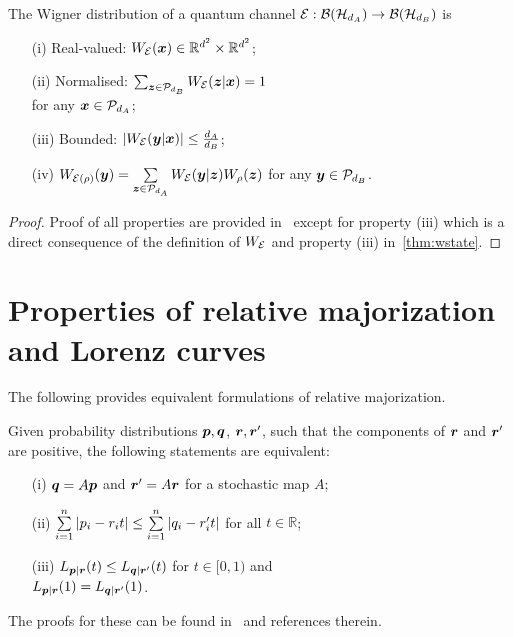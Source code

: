 \documentclass[pra,
aps,
twocolumn,
superscriptaddress,
groupedaddress,
nofootinbib,
reprint
]{revtex4-1}
\begin{document}
\begin{proposition}
    \label{thm:wchannel}
    The Wigner distribution of a quantum channel ${\mathcal E}: \mathcal{B}(\mathcal{H}_{d_A}) \rightarrow \mathcal{B}(\mathcal{H}_{d_B})$ is
    \begin{enumerate}
        \item[(i)]\label{en:wo1} Real-valued: $\W{\E}(\x) \in \mathbb{R}^{d^2} \times \mathbb{R}^{d^2}$;
        \item[(ii)]\label{en:wo2} Normalised: $\sum_{\bmz \in \cal{P}_{d_B}} \W[\bmz|\bmx]{\E} = 1$ \\ 
        for any $\bm{x} \in \mathcal{P}_{d_A}$;
        \item[(iii)]\label{en:wo3} Bounded: $\abs{\W[\bmy|\bmx]{\E}} \leq \frac{d_A}{d_B}$;
	    \item[(iv)]\label{en:wo4} $\W[\bmy]{\E(\rho)} = \sum\limits_{\bmz \in \cal{P}_{d_{A}}} \W[\bmy|\bmz]{\E} \W[\bmz]{\rho}$ for any $\bm{y} \in \mathcal{P}_{d_B}$.
    \end{enumerate}
\end{proposition}
\begin{proof}
	Proof of all properties are provided in~\cite{Wang_2019} except for property (iii) which is a direct consequence of the definition of $\W{\E}$ and property (iii) in~\cref{thm:wstate}.
\end{proof}


\section{Properties of relative majorization and Lorenz curves}
\label{app:major}
	
The following provides equivalent formulations of relative majorization. 

\begin{proposition}\label{prop:rmajor}
Given probability distributions $\boldsymbol{p}, \boldsymbol{q}$, $\boldsymbol{r} , \boldsymbol{r}'$, such that the components of $\boldsymbol{r}$ and $\boldsymbol{r}'$ are positive, the following statements are equivalent:
  \begin{enumerate}
    \item[(i)] $\boldsymbol{q} = A\boldsymbol{p}$ and $\boldsymbol{r}' = A\boldsymbol{r}$ for a stochastic map $A$;
    \item[(ii)]\label{en:tm3} $\sum\limits_{i=1}^n \abs{p_i - r_i t} \leq \sum\limits_{i=1}^n \abs{q_i - r'_i t}$ for all $t \in \mathbb{R}$;
    \item[(iii)] $L_{\boldsymbol{p}|\boldsymbol{r}}(t) \leq L_{\boldsymbol{q}|\boldsymbol{r}'}(t)$ for $t\in [0,1)$ and \vspace{5pt}\\ $L_{\boldsymbol{p}|\boldsymbol{r}}(1) = L_{\boldsymbol{q}|\boldsymbol{r}'}(1)$.
  \end{enumerate}
\end{proposition}
The proofs for these can be found in~\cite{cit:marshall,ruch_mixing_1978,Renes_2016,Buscemi_2017} and references therein.
\end{document}
